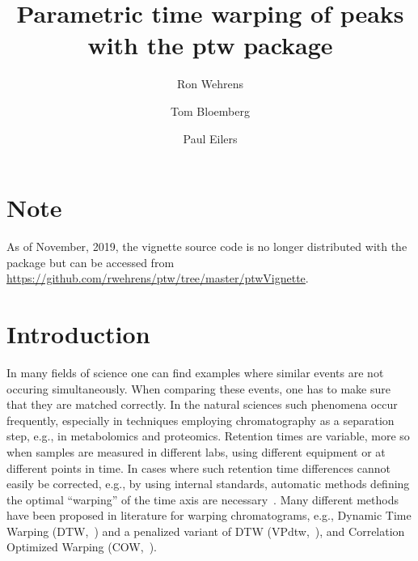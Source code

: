 \documentclass[a4paper,11pt]{article}
\title{Parametric time warping of peaks with the ptw package}
\author{Ron Wehrens \and Tom Bloemberg \and Paul Eilers}
\begin{document}
\maketitle

\section*{Note}
As of November, 2019, the vignette source code is no longer
distributed with the package but can be accessed from\\
\url{https://github.com/rwehrens/ptw/tree/master/ptwVignette}.

\section{Introduction}
In many fields of science one can find examples where similar events
are not occuring simultaneously. When comparing these events, one has
to make sure that they are matched correctly. In the natural sciences
such phenomena occur frequently,
especially in techniques employing chromatography as a
separation step, e.g., in metabolomics and proteomics. Retention times
are variable, more so when samples are measured in different labs,
using different equipment or at different points in time. In cases
where such retention time differences cannot easily be corrected,
e.g., by using internal standards, automatic methods defining the
optimal ``warping'' of the time axis are necessary~\citet{Bloemberg2013}.
Many different methods have been proposed in literature for warping
chromatograms, e.g., Dynamic Time Warping (DTW,~\citet{Wang1987}) and
a penalized variant of DTW (VPdtw,~\citet{Clifford2012}), and
Correlation Optimized Warping (COW,~\citet{Tomasi2004}).
\end{document}
